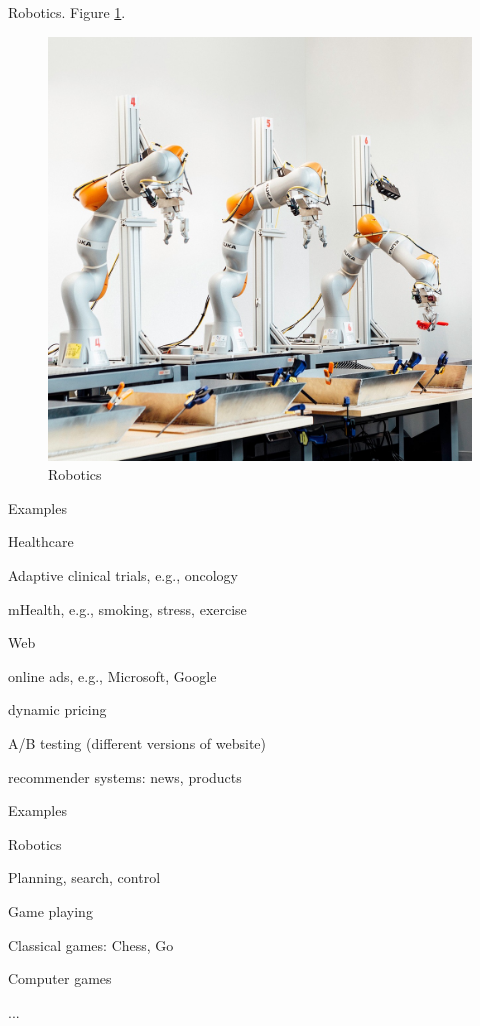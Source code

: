 \documentclass[english]{article}
\begin{document}
\item {Robotics}. Figure \ref{robo}.
\begin{figure}[h!]
\begin{center}
\includegraphics[width=0.3\paperwidth]{robo}
    \caption{Robotics}
    \label{robo}
\end{center}
\end{figure}




\item {Examples}
\bitem
\item Healthcare
\bitem
\item Adaptive clinical trials, e.g., oncology
\item mHealth, e.g., smoking, stress, exercise
\eitem
\item Web
\bitem
\item online ads, e.g., Microsoft, Google
\item dynamic pricing
\item A/B testing (different versions of website)
\item recommender systems: news, products
\eitem

\eitem



\item {Examples}
\bitem
\item Robotics
\bitem
\item Planning, search, control 
\eitem
\item Game playing
\bitem
\item Classical games: Chess, Go
\item Computer games
\eitem
\item ...
\eitem
\end{document}
